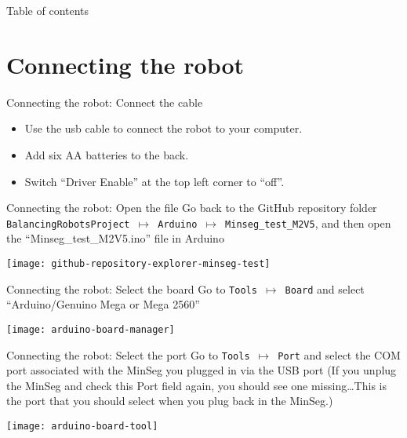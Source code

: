 \begin{frame}{Table of contents}
	\tableofcontents
\end{frame}

\section{Connecting the robot}
\begin{frame}{Connecting the robot: Connect the cable}
	\begin{itemize}
		\item Use the usb cable to connect the robot to your computer. 
		\item Add six AA batteries to the back.
		\item Switch  ``Driver Enable'' at the top left corner to ``off''.
		\end{itemize}
\end{frame}

\begin{frame}{Connecting the robot: Open the file}
	Go back to the GitHub repository folder \texttt{BalancingRobotsProject $\mapsto$ Arduino $\mapsto$ Minseg\_test\_M2V5}, and then open the ``Minseg\_test\_M2V5.ino'' file in Arduino
	\begin{center}
		\texttt{[image: github-repository-explorer-minseg-test]}
	\end{center}
\end{frame}


\begin{frame}{Connecting the robot: Select the board}
	Go to \texttt{Tools $\mapsto$ Board} and select ``Arduino/Genuino Mega or Mega 2560''
	\begin{center}
		\texttt{[image: arduino-board-manager]}
	\end{center}
\end{frame}


\begin{frame}{Connecting the robot: Select the port}
	Go to \texttt{Tools $\mapsto$ Port} and select the COM port associated with the MinSeg you plugged in via the USB port (If you unplug the MinSeg and check this Port field again, you should see one missing\ldots This is the port that you should select when you plug back in the MinSeg.)
	\begin{center}
		\texttt{[image: arduino-board-tool]}
	\end{center}
\end{frame}

